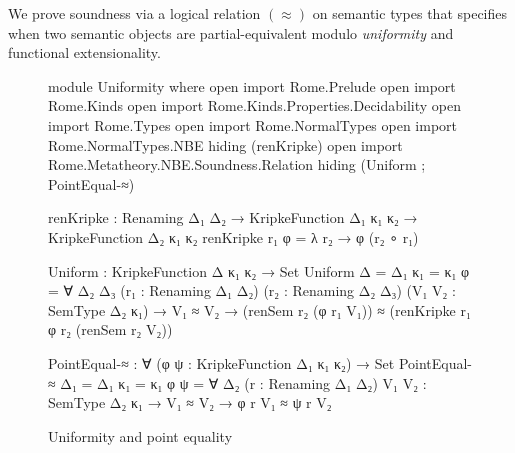We prove soundness via a logical relation $(\approx)$ on semantic types that specifies when two semantic objects are partial-equivalent modulo \emph{uniformity} and functional extensionality.

\begin{figure}
\begin{AgdaAlign}
\begin{code}[hide]
module Uniformity where
  open import Rome.Prelude
  open import Rome.Kinds
  open import Rome.Kinds.Properties.Decidability
  open import Rome.Types
  open import Rome.NormalTypes
  open import Rome.NormalTypes.NBE hiding (renKripke)
  open import Rome.Metatheory.NBE.Soundness.Relation hiding 
    (Uniform ; PointEqual-≈)
\end{code}
\begin{code}
  renKripke : Renaming Δ₁ Δ₂ → 
              KripkeFunction Δ₁ κ₁ κ₂ → 
              KripkeFunction Δ₂ κ₁ κ₂
  renKripke r₁ φ = λ r₂ → φ (r₂ ∘ r₁) 

  Uniform : KripkeFunction Δ κ₁ κ₂ → Set
  Uniform {Δ = Δ₁} {κ₁ = κ₁} φ = 
    ∀ {Δ₂ Δ₃} (r₁ : Renaming Δ₁ Δ₂) 
      (r₂ : Renaming Δ₂ Δ₃) 
      (V₁ V₂ : SemType Δ₂ κ₁) →
      V₁ ≈ V₂ → 
      (renSem r₂ (φ r₁ V₁)) ≈ (renKripke r₁ φ r₂ (renSem r₂ V₂))

  PointEqual-≈ : ∀ (φ ψ : KripkeFunction Δ₁ κ₁ κ₂) → Set
  PointEqual-≈ {Δ₁ = Δ₁} {κ₁ = κ₁} φ ψ = 
    ∀ {Δ₂} (r : Renaming Δ₁ Δ₂) {V₁ V₂ : SemType Δ₂ κ₁} → 
    V₁ ≈ V₂ → 
    φ r V₁ ≈ ψ r V₂
\end{code}
\end{AgdaAlign}
\caption{Uniformity and point equality}
\label{fig:uniformity-and-PE}
\end{figure}


